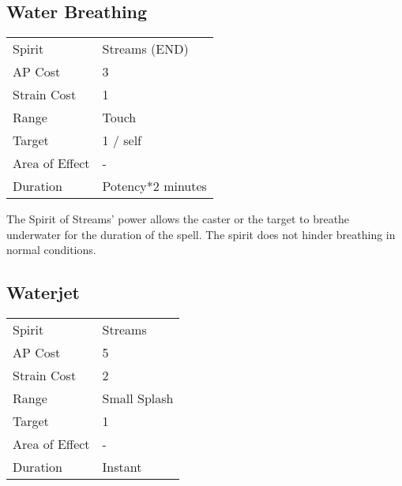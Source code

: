 \documentclass[11pt,a4paper,twocolumn]{book}
\begin{document}

\vfill
\subsection*{Water Breathing}
{
	\begin{tabu} to 70mm{| X[l,4] | X[l,7] |}
		\hline
		Spirit         & Streams (END)            \\
		AP Cost        & 3                        \\
		Strain Cost    & 1                        \\
		Range          & Touch                    \\
		Target         & 1 / self                 \\
		Area of Effect & -                        \\
		Duration       & Potency*2 minutes \\ \hline
	\end{tabu}
	
}
\medskip

The Spirit of Streams' power allows the caster or the target to breathe underwater for the duration of the spell. The spirit does not hinder breathing in normal conditions.

\subsection*{Waterjet}
{
	\begin{tabu} to 70mm{| X[l,4] | X[l,7] |}
		\hline
		Spirit         & Streams      \\
		AP Cost        & 5            \\
		Strain Cost    & 2            \\
		Range          & Small Splash \\
		Target         & 1            \\
		Area of Effect & -            \\
		Duration       & Instant      \\ \hline
	\end{tabu}
	
}
\medskip
\end{document}

